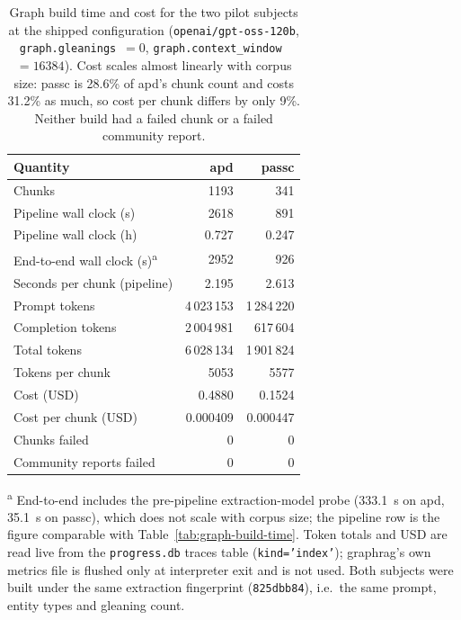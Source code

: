 \begin{table}[htbp]
  \centering
  \caption{Graph build time and cost for the two pilot subjects at the shipped configuration
    (\texttt{openai/gpt-oss-120b}, \texttt{graph.gleanings}~$=0$,
    \texttt{graph.context\_window}~$=16384$). Cost scales almost linearly with corpus size: passc
    is 28.6\% of apd's chunk count and costs 31.2\% as much, so cost per chunk differs by only
    9\%. Neither build had a failed chunk or a failed community report.}
  \label{tab:graph-build-two-subjects}
  \begin{tabular}{lrr}
    \toprule
    Quantity & apd & passc \\
    \midrule
    Chunks                                   &      1193 &       341 \\
    \midrule
    Pipeline wall clock (s)                  &      2618 &       891 \\
    Pipeline wall clock (h)                  &     0.727 &     0.247 \\
    End-to-end wall clock (s)\textsuperscript{a} & 2952 &       926 \\
    Seconds per chunk (pipeline)             &     2.195 &     2.613 \\
    \midrule
    Prompt tokens                            & 4\,023\,153 & 1\,284\,220 \\
    Completion tokens                        & 2\,004\,981 & \phantom{0}617\,604 \\
    Total tokens                             & 6\,028\,134 & 1\,901\,824 \\
    Tokens per chunk                         &      5053 &      5577 \\
    \midrule
    Cost (USD)                               &    0.4880 &    0.1524 \\
    Cost per chunk (USD)                     &  0.000409 &  0.000447 \\
    \midrule
    Chunks failed                            &         0 &         0 \\
    Community reports failed                 &         0 &         0 \\
    \bottomrule
  \end{tabular}

  \vspace{0.5em}
  \footnotesize
  \textsuperscript{a} End-to-end includes the pre-pipeline extraction-model probe (333.1~s on apd,
  35.1~s on passc), which does not scale with corpus size; the pipeline row is the figure
  comparable with Table~\ref{tab:graph-build-time}. Token totals and USD are read live from the
  \texttt{progress.db} traces table (\texttt{kind='index'}); graphrag's own metrics file is flushed
  only at interpreter exit and is not used. Both subjects were built under the same extraction
  fingerprint (\texttt{825dbb84}), i.e.\ the same prompt, entity types and gleaning count.
\end{table}
